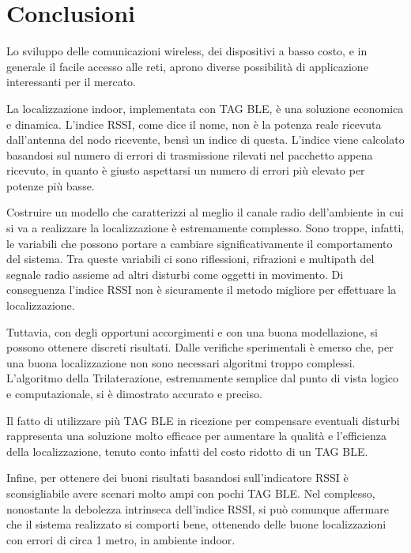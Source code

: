 
\chapter*{Conclusioni}
\label{cap:conclusioni}

Lo sviluppo delle comunicazioni wireless, dei dispositivi a basso costo, e in generale il facile accesso alle reti, aprono diverse possibilità di applicazione interessanti per il mercato.

La localizzazione indoor, implementata con TAG BLE, è una soluzione economica e dinamica. L'indice RSSI, come dice il nome, non è la potenza reale ricevuta dall'antenna del nodo ricevente, bensì un indice di questa. L'indice viene calcolato basandosi sul numero di errori di trasmissione rilevati nel pacchetto appena ricevuto, in quanto è giusto aspettarsi un numero di errori più elevato per potenze più basse.

Costruire un modello che caratterizzi al meglio il canale radio dell'ambiente in cui si va a realizzare la localizzazione è estremamente complesso. Sono troppe, infatti, le variabili che possono portare a cambiare significativamente il comportamento del sistema. Tra queste variabili ci sono riflessioni, rifrazioni e multipath del segnale radio assieme ad altri disturbi come oggetti in movimento. Di conseguenza l'indice RSSI non è sicuramente il metodo migliore per effettuare la localizzazione.

Tuttavia, con degli opportuni accorgimenti e con una buona modellazione, si possono ottenere discreti risultati. Dalle verifiche sperimentali è emerso che, per una buona localizzazione non sono necessari algoritmi troppo complessi. L'algoritmo della Trilaterazione, estremamente semplice dal punto di vista logico e computazionale, si è dimostrato accurato e preciso.

Il fatto di utilizzare più TAG BLE in ricezione per compensare eventuali disturbi rappresenta una soluzione molto efficace per aumentare la qualità e l'efficienza della localizzazione, tenuto conto infatti del costo ridotto di un TAG BLE.

Infine, per ottenere dei buoni risultati basandosi sull’indicatore RSSI è sconsigliabile avere scenari molto ampi con pochi TAG BLE.
Nel complesso, nonostante la debolezza intrinseca dell’indice RSSI, si può comunque affermare che il sistema realizzato si comporti bene, ottenendo delle buone localizzazioni con errori di circa 1 metro, in ambiente indoor.

